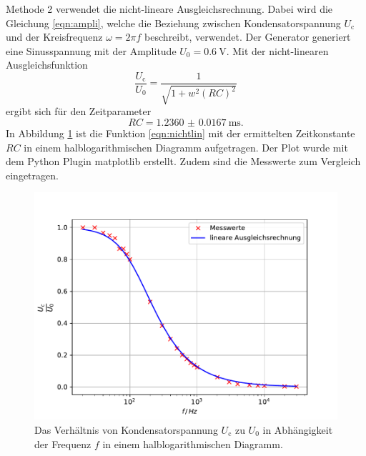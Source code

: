 Methode 2 verwendet die nicht-lineare Ausgleichsrechnung.
Dabei wird die Gleichung \ref{eqn:ampli}, welche die Beziehung zwischen Kondensatorspannung $U_\text{c}$ und der Kreisfrequenz $\omega = 2 \pi f$ beschreibt, verwendet.
Der Generator generiert eine Sinusspannung mit der Amplitude $U_0 = \SI{0.6}{\volt}$.
Mit der nicht-linearen Ausgleichsfunktion
\begin{equation}
    \frac{U_\text{c}}{U_0} = \frac{1}{\sqrt{1+w^2(RC)^2}}
    \label{eqn:nichtlin}
\end{equation}
ergibt sich für den Zeitparameter
\begin{equation*}
    RC = \SI{1.2360(167)}{\milli\second} .
\end{equation*}
In Abbildung \ref{fig:spannung} ist die Funktion \ref{eqn:nichtlin} mit der ermittelten Zeitkonstante $RC$ in einem halblogarithmischen Diagramm aufgetragen.
Der Plot wurde mit dem Python Plugin matplotlib \cite{matplotlib} erstellt.
Zudem sind die Messwerte zum Vergleich eingetragen.
\begin{figure}
    \centering
    \includegraphics[width=\textwidth]{content/data/plotb.pdf}
    \caption{Das Verhältnis von Kondensatorspannung $U_\text{c}$ zu $U_0$ in Abhängigkeit der Frequenz $f$ in einem halblogarithmischen Diagramm.}
    \label{fig:spannung}
\end{figure}
\FloatBarrier

